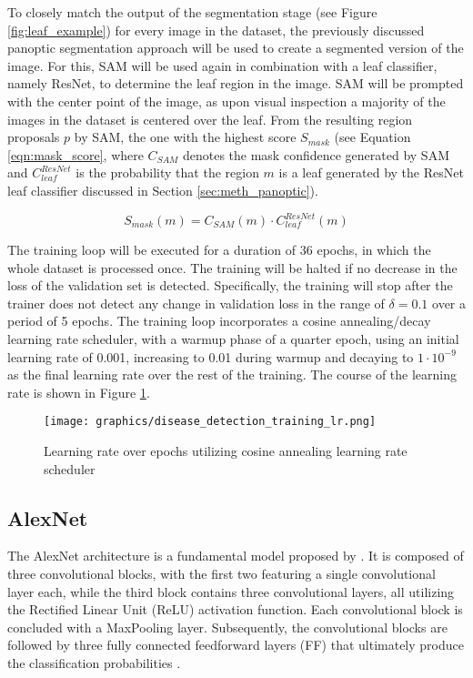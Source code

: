 \documentclass[draft,final]{vutinfth} %
\begin{document}
To closely match the output of the segmentation stage (see Figure \ref{fig:leaf_example}) for every image in the dataset, the previously discussed panoptic segmentation approach will be used to create a segmented version of the image. For this, SAM will be used again in combination with a leaf classifier, namely ResNet, to determine the leaf region in the image. SAM will be prompted with the center point of the image, as upon visual inspection a majority of the images in the dataset is centered over the leaf. From the resulting region proposals $p$ by SAM, the one with the highest score $S_{mask}$ (see Equation \eqref{eqn:mask_score}, where $C_{SAM}$ denotes the mask confidence generated by SAM and $C_{leaf}^{ResNet}$ is the probability that the region $m$ is a leaf generated by the ResNet leaf classifier discussed in Section \ref{sec:meth_panoptic}).

\begin{equation} \label{eqn:mask_score}
    S_{mask}(m) = C_{SAM}(m) \cdot C_{leaf}^{ResNet}(m)
\end{equation}

The training loop will be executed for a duration of 36 epochs, in which the whole dataset is processed once. The training will be halted if no decrease in the loss of the validation set is detected. Specifically, the training will stop after the trainer does not detect any change in validation loss in the range of $\delta = 0.1$ over a period of 5 epochs. The training loop incorporates a cosine annealing/decay learning rate scheduler, with a warmup phase of a quarter epoch, using an initial learning rate of 0.001, increasing to 0.01 during warmup and decaying to $1 \cdot 10^{-9}$ as the final learning rate over the rest of the training. The course of the learning rate is shown in Figure \ref{fig:disease_detection_lr}.

\begin{figure}
    \centering
    \texttt{[image: graphics/disease\_detection\_training\_lr.png]}
    \caption{Learning rate over epochs utilizing cosine annealing learning rate scheduler}
    \label{fig:disease_detection_lr}
\end{figure}

\subsection{AlexNet}
The AlexNet architecture is a fundamental model proposed by \citeauthor{krizhevsky_imagenet_2012}. It is composed of three convolutional blocks, with the first two featuring a single convolutional layer each, while the third block contains three convolutional layers, all utilizing the Rectified Linear Unit (ReLU) activation function. Each convolutional block is concluded with a MaxPooling layer. Subsequently, the convolutional blocks are followed by three fully connected feedforward layers (FF) that ultimately produce the classification probabilities \cite{krizhevsky_imagenet_2012}.
\end{document}
